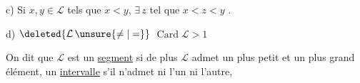 c) Si $x,y\in\mathcal L$ tels que $x<y$, $\exists\,z$ tel que $x<z<y$ .

d) $\deleted{\mathcal L\,\unsure{\ne|=}}$ $\operatorname{Card}\mathcal L>1$ 


On dit que $\mathcal L$ est un \uline{segment} si de plus $\mathcal L$ admet un plus petit et
 un plus grand élément, un \uline{intervalle} s'il n'admet ni l'un ni l'autre,


